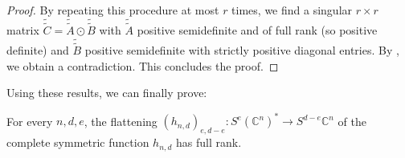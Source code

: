 \documentclass{toc}
\newcommand{\bbC}{\mathbb{C}}
\renewcommand{\tilde}[1]{\widetilde{#1}}
\begin{document}
\begin{proof}
By repeating this procedure at most $r$ times, we find a singular $r\times r$ matrix $\tilde{\tilde{C}} =  \tilde{\tilde{A}} \odot \tilde{\tilde{B}}$ with $\tilde{\tilde{A}}$ positive semidefinite and of full rank (so positive definite) and $\tilde{\tilde{B}}$ positive semidefinite with strictly positive diagonal entries. By , we obtain a contradiction. This concludes the proof.
\end{proof}

Using these results, we can finally prove:
\begin{theorem}\label{thm: hnd have maximal catalecticant rank}
 For every $n,d,e$, the flattening $(h_{n,d})_{e,d-e} : S^e (\bbC^n)^* \to S^{d-e} \bbC^n$ of the complete symmetric function $h_{n,d}$ has full rank.
\end{theorem}
\end{document}

